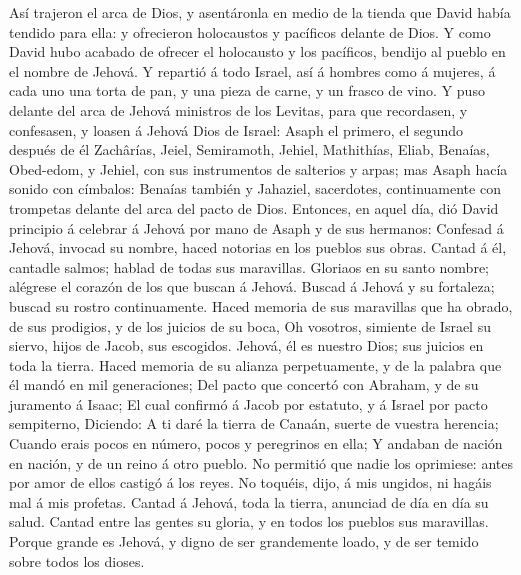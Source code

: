  Así trajeron el arca de Dios, y asentáronla en medio de
la tienda que David había tendido para ella: y ofrecieron holocaustos y
pacíficos delante de Dios.  Y como David hubo acabado de
ofrecer el holocausto y los pacíficos, bendijo al pueblo en el nombre de
Jehová.  Y repartió á todo Israel, así á hombres como á
mujeres, á cada uno una torta de pan, y una pieza de carne, y un frasco
de vino.  Y puso delante del arca de Jehová ministros de
los Levitas, para que recordasen, y confesasen, y loasen á Jehová Dios
de Israel:  Asaph el primero, el segundo después de él
Zachârías, Jeiel, Semiramoth, Jehiel, Mathithías, Eliab, Benaías,
Obed-edom, y Jehiel, con sus instrumentos de salterios y arpas; mas
Asaph hacía sonido con címbalos:  Benaías también y
Jahaziel, sacerdotes, continuamente con trompetas delante del arca del
pacto de Dios.  Entonces, en aquel día, dió David
principio á celebrar á Jehová por mano de Asaph y de sus hermanos:
 Confesad á Jehová, invocad su nombre, haced notorias en
los pueblos sus obras.  Cantad á él, cantadle salmos;
hablad de todas sus maravillas.  Gloriaos en su santo
nombre; alégrese el corazón de los que buscan á Jehová. 
Buscad á Jehová y su fortaleza; buscad su rostro continuamente.
 Haced memoria de sus maravillas que ha obrado, de sus
prodigios, y de los juicios de su boca,  Oh vosotros,
simiente de Israel su siervo, hijos de Jacob, sus escogidos.
 Jehová, él es nuestro Dios; sus juicios en toda la
tierra.  Haced memoria de su alianza perpetuamente, y de
la palabra que él mandó en mil generaciones;  Del pacto
que concertó con Abraham, y de su juramento á Isaac;  El
cual confirmó á Jacob por estatuto, y á Israel por pacto sempiterno,
 Diciendo: A ti daré la tierra de Canaán, suerte de
vuestra herencia;  Cuando erais pocos en número, pocos y
peregrinos en ella;  Y andaban de nación en nación, y de
un reino á otro pueblo.  No permitió que nadie los
oprimiese: antes por amor de ellos castigó á los reyes. 
No toquéis, dijo, á mis ungidos, ni hagáis mal á mis profetas.
 Cantad á Jehová, toda la tierra, anunciad de día en día
su salud.  Cantad entre las gentes su gloria, y en todos
los pueblos sus maravillas.  Porque grande es Jehová, y
digno de ser grandemente loado, y de ser temido sobre todos los dioses.
